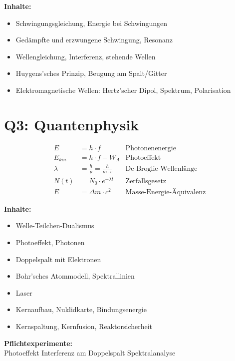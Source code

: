 \documentclass[11pt,a4paper]{article}
\begin{document}
\textbf{Inhalte:}
\begin{itemize}[leftmargin=0.5cm, itemsep=1pt]
\item Schwingungsgleichung, Energie bei Schwingungen
\item Gedämpfte und erzwungene Schwingung, Resonanz
\item Wellengleichung, Interferenz, stehende Wellen
\item Huygens'sches Prinzip, Beugung am Spalt/Gitter
\item Elektromagnetische Wellen: Hertz'scher Dipol, Spektrum, Polarisation
\end{itemize}

\section{Q3: Quantenphysik}

\begin{formelbox}
\begin{align*}
E &= h \cdot f & \text{Photonenenergie} \\
E_{kin} &= h \cdot f - W_A & \text{Photoeffekt} \\
\lambda &= \frac{h}{p} = \frac{h}{m \cdot v} & \text{De-Broglie-Wellenlänge} \\
N(t) &= N_0 \cdot e^{-\lambda t} & \text{Zerfallsgesetz} \\
E &= \Delta m \cdot c^2 & \text{Masse-Energie-Äquivalenz}
\end{align*}
\end{formelbox}

\textbf{Inhalte:}
\begin{itemize}[leftmargin=0.5cm, itemsep=1pt]
\item Welle-Teilchen-Dualismus
\item Photoeffekt, Photonen
\item Doppelspalt mit Elektronen
\item Bohr'sches Atommodell, Spektrallinien
\item Laser
\item Kernaufbau, Nuklidkarte, Bindungsenergie
\item Kernspaltung, Kernfusion, Reaktorsicherheit
\end{itemize}

\begin{experimentbox}
\textbf{Pflichtexperimente:}\\
Photoeffekt \textbullet{} Interferenz am Doppelspalt \textbullet{} Spektralanalyse
\end{experimentbox}
\end{document}
